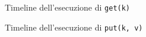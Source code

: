 \documentclass[twoside]{article}
\begin{document}
\begin{multicols}{2}
\begin{figure}[t]
\begin{minipage}[b]{0.48\textwidth}
{{}
}
\caption{Timeline dell'esecuzione di \texttt{get(k)}}
\label{fig:get}
\end{minipage}
\enskip
\begin{minipage}[b]{0.48\textwidth}
\caption{Timeline dell'esecuzione di \texttt{put(k, v)}}
\label{fig:put}
\end{minipage}
\end{figure}


\end{multicols}
\end{document}
